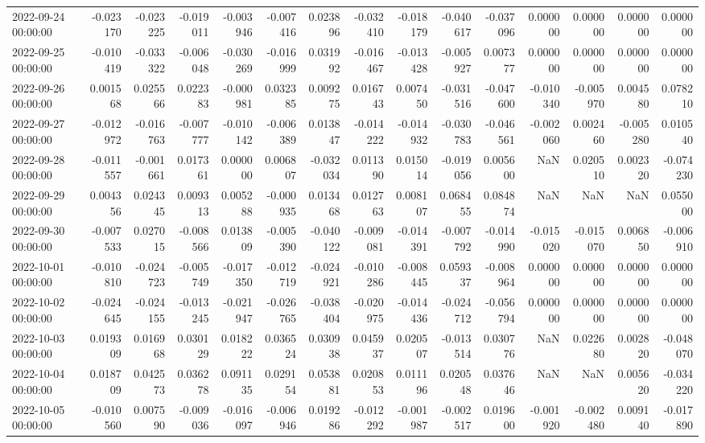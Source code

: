 \begin{tabular}{lrrrrrrrrrrrrrr}
2022-09-24 00:00:00 & -0.023170 & -0.023225 & -0.019011 & -0.003946 & -0.007416 & 0.023896 & -0.032410 & -0.018179 & -0.040617 & -0.037096 & 0.000000 & 0.000000 & 0.000000 & 0.000000 \\
2022-09-25 00:00:00 & -0.010419 & -0.033322 & -0.006048 & -0.030269 & -0.016999 & 0.031992 & -0.016467 & -0.013428 & -0.005927 & 0.007377 & 0.000000 & 0.000000 & 0.000000 & 0.000000 \\
2022-09-26 00:00:00 & 0.001568 & 0.025566 & 0.022383 & -0.000981 & 0.032385 & 0.009275 & 0.016743 & 0.007450 & -0.031516 & -0.047600 & -0.010340 & -0.005970 & 0.004580 & 0.078210 \\
2022-09-27 00:00:00 & -0.012972 & -0.016763 & -0.007777 & -0.010142 & -0.006389 & 0.013847 & -0.014222 & -0.014932 & -0.030783 & -0.046561 & -0.002060 & 0.002460 & -0.005280 & 0.010540 \\
2022-09-28 00:00:00 & -0.011557 & -0.001661 & 0.017361 & 0.000000 & 0.006807 & -0.032034 & 0.011390 & 0.015014 & -0.019056 & 0.005600 & NaN & 0.020510 & 0.002320 & -0.074230 \\
2022-09-29 00:00:00 & 0.004356 & 0.024345 & 0.009313 & 0.005288 & -0.000935 & 0.013468 & 0.012763 & 0.008107 & 0.068455 & 0.084874 & NaN & NaN & NaN & 0.055000 \\
2022-09-30 00:00:00 & -0.007533 & 0.027015 & -0.008566 & 0.013809 & -0.005390 & -0.040122 & -0.009081 & -0.014391 & -0.007792 & -0.014990 & -0.015020 & -0.015070 & 0.006850 & -0.006910 \\
2022-10-01 00:00:00 & -0.010810 & -0.024723 & -0.005749 & -0.017350 & -0.012719 & -0.024921 & -0.010286 & -0.008445 & 0.059337 & -0.008964 & 0.000000 & 0.000000 & 0.000000 & 0.000000 \\
2022-10-02 00:00:00 & -0.024645 & -0.024155 & -0.013245 & -0.021947 & -0.026765 & -0.038404 & -0.020975 & -0.014436 & -0.024712 & -0.056794 & 0.000000 & 0.000000 & 0.000000 & 0.000000 \\
2022-10-03 00:00:00 & 0.019309 & 0.016968 & 0.030129 & 0.018222 & 0.036524 & 0.030938 & 0.045937 & 0.020507 & -0.013514 & 0.030776 & NaN & 0.022680 & 0.002820 & -0.048070 \\
2022-10-04 00:00:00 & 0.018709 & 0.042573 & 0.036278 & 0.091135 & 0.029154 & 0.053881 & 0.020853 & 0.011196 & 0.020548 & 0.037646 & NaN & NaN & 0.005620 & -0.034220 \\
2022-10-05 00:00:00 & -0.010560 & 0.007590 & -0.009036 & -0.016097 & -0.006946 & 0.019286 & -0.012292 & -0.001987 & -0.002517 & 0.019600 & -0.001920 & -0.002480 & 0.009140 & -0.017890 \\

\end{tabular}
